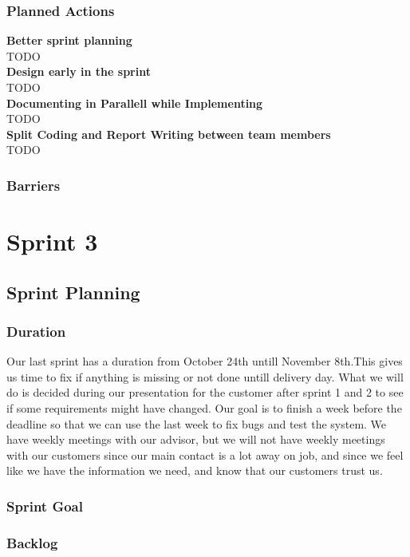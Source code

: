 \documentclass{report}
\begin{document}
\subsection{Planned Actions} \label{subsec:planned_act2}
\textbf{Better sprint planning}\\
TODO\\
\textbf{Design early in the sprint}\\
TODO\\
\textbf{Documenting in Parallell while Implementing}\\
TODO\\
\textbf{Split Coding and Report Writing between team members}\\
TODO
\subsection{Barriers} \label{subsec:barriers2}

\chapter{Sprint 3} \label{cha:sprint_3}
\section{Sprint Planning} \label{sec:sprint_planning3}
\subsection{Duration} \label{subsec:duration3}
Our last sprint has a duration from October 24th untill November 8th.This gives us time to fix if anything is missing or not done untill delivery day. What we will do is decided during our presentation for the customer after sprint 1 and 2 to see if some requirements might have changed. Our goal is to finish a week before the deadline so that we can use the last week to fix bugs and test the system. We have weekly meetings with our advisor, but we will not have weekly meetings with our customers since our main contact is a lot away on job, and since we feel like we have the information we need, and know that our customers trust us.
\subsection{Sprint Goal} \label{subsec:sprint_goal3}
\subsection{Backlog} \label{subsec:backlog} %
\end{document}
